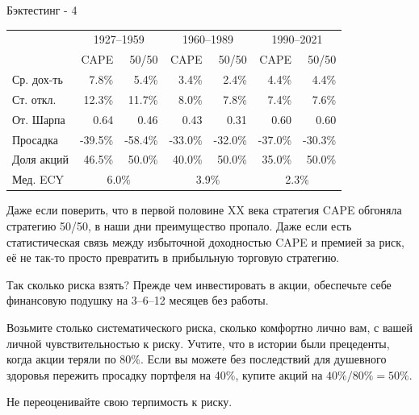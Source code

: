\documentclass{beamer}
\begin{document}
\begin{frame}{Бэктестинг - 4}
\centering
{\small
\begin{tabular}{l|r|r|r|r|r|r}
& \multicolumn{2}{c|}{1927--1959} & \multicolumn{2}{c|}{1960--1989} & \multicolumn{2}{c}{1990--2021} \\ 
\cline{2-7}
           & CAPE      & 50/50     & CAPE      & 50/50     & CAPE     & 50/50 \\   \hline
Ср. дох-ть &    7.8\%  &     5.4\% &    3.4\%  &    2.4\%  &    4.4\%  &    4.4\%   \\
Ст. откл.  &   12.3\%  &    11.7\% &    8.0\%  &    7.8\%  &    7.4\%  &    7.6\%   \\
От. Шарпа  &    0.64   &    0.46   &    0.43   &    0.31   &    0.60   &    0.60    \\
Просадка   &  -39.5\% & -58.4\% & -33.0\% & -32.0\% & -37.0\% & -30.3\% \\
Доля акций &   46.5\%  &   50.0\%  &   40.0\%  &   50.0\%  &   35.0\%  &   50.0\%  \\ 
\cline{2-7}
Мед. ECY   & \multicolumn{2}{c|}{6.0\%} & \multicolumn{2}{c|}{3.9\%} & \multicolumn{2}{c}{2.3\%} 
\end{tabular}
}

\justify
Даже если поверить, что в первой половине XX века стратегия CAPE обгоняла стратегию
50/50, в наши дни преимущество пропало. Даже если есть статистическая связь 
между избыточной доходностью CAPE и премией за риск, её не так-то просто 
превратить в прибыльную торговую стратегию.
\end{frame}



\begin{frame}{Так сколько риска взять?}
\justify
Прежде чем инвестировать в акции, обеспечьте себе финансовую подушку на 
3--6--12 месяцев без работы.

\justify
Возьмите столько систематического риска, сколько комфортно лично вам, с вашей 
личной чувствительностью к риску. Учтите, что в истории были прецеденты, когда 
акции теряли по 80\%. Если вы можете без последствий для душевного здоровья 
пережить просадку портфеля на 40\%, купите акций на $40\% / 80\% = 50\%$.

\justify
Не переоценивайте свою терпимость к риску.

\end{frame}
\end{document}
